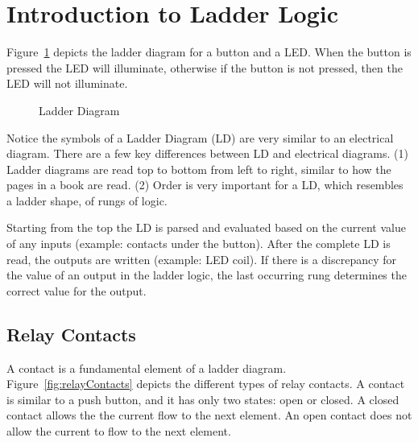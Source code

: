 \section{Introduction to Ladder Logic} 
Figure~\ref{fig:ladderDiagram} depicts the ladder diagram for a button and a LED.  When the button is pressed the LED will illuminate, otherwise if the button is not pressed, then the LED will not illuminate. 

\begin{figure}[!htb]
\begin{center}
\end{center}
\caption{Ladder Diagram}
\label{fig:ladderDiagram}
\end{figure}

Notice the symbols of a Ladder Diagram (LD) are very similar to an electrical diagram. There are a few key differences between LD and electrical diagrams. (1) Ladder diagrams are read top to bottom from left to right, similar to how the pages in a book are read. (2) Order is very important for a LD, which resembles a ladder shape, of rungs of logic.

Starting from the top the LD is parsed and evaluated based on the current value of any inputs (example: contacts under the button). After the complete LD is read, the outputs are written (example: LED coil). If there is a discrepancy for the value of an output in the ladder logic, the last occurring rung determines the correct value for the output. 


\subsection{Relay Contacts}
A contact is a fundamental element of a ladder diagram. Figure~\ref{fig:relayContacts} depicts the different types of relay contacts. A contact is similar to a push button, and it has only two states: open or closed. A closed contact allows the the current flow to the next element. An open contact does not allow the current to flow to the next element.

